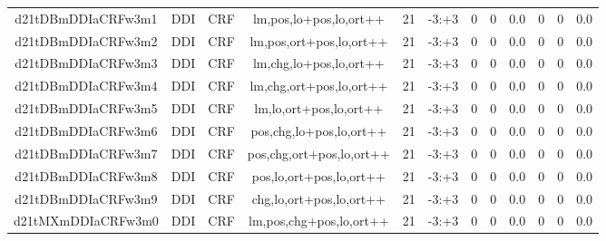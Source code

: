 \documentclass[a4paper]{article}
\begin{document}
\begin{landscape}
\begin{center}
\begin{tabular}{ |c|c|c|c|c|c|c|c|c|c|c|c|}
 
 	
 	\small{ d21tDBmDDIaCRFw3m1 } & \small{ DDI} & \small{  CRF }  & lm,pos,lo+pos,lo,ort++  &  21 &  \small{  -3:+3 }  &  0 & 0 & 0.0  &  0 & 0 & 0.0 \\
 	

 
 	
 	\small{ d21tDBmDDIaCRFw3m2 } & \small{ DDI} & \small{  CRF }  & lm,pos,ort+pos,lo,ort++  &  21 &  \small{  -3:+3 }  &  0 & 0 & 0.0  &  0 & 0 & 0.0 \\
 	

 
 	
 	\small{ d21tDBmDDIaCRFw3m3 } & \small{ DDI} & \small{  CRF }  & lm,chg,lo+pos,lo,ort++  &  21 &  \small{  -3:+3 }  &  0 & 0 & 0.0  &  0 & 0 & 0.0 \\
 	

 
 	
 	\small{ d21tDBmDDIaCRFw3m4 } & \small{ DDI} & \small{  CRF }  & lm,chg,ort+pos,lo,ort++  &  21 &  \small{  -3:+3 }  &  0 & 0 & 0.0  &  0 & 0 & 0.0 \\
 	

 
 	
 	\small{ d21tDBmDDIaCRFw3m5 } & \small{ DDI} & \small{  CRF }  & lm,lo,ort+pos,lo,ort++  &  21 &  \small{  -3:+3 }  &  0 & 0 & 0.0  &  0 & 0 & 0.0 \\
 	

 
 	
 	\small{ d21tDBmDDIaCRFw3m6 } & \small{ DDI} & \small{  CRF }  & pos,chg,lo+pos,lo,ort++  &  21 &  \small{  -3:+3 }  &  0 & 0 & 0.0  &  0 & 0 & 0.0 \\
 	

 
 	
 	\small{ d21tDBmDDIaCRFw3m7 } & \small{ DDI} & \small{  CRF }  & pos,chg,ort+pos,lo,ort++  &  21 &  \small{  -3:+3 }  &  0 & 0 & 0.0  &  0 & 0 & 0.0 \\
 	

 
 	
 	\small{ d21tDBmDDIaCRFw3m8 } & \small{ DDI} & \small{  CRF }  & pos,lo,ort+pos,lo,ort++  &  21 &  \small{  -3:+3 }  &  0 & 0 & 0.0  &  0 & 0 & 0.0 \\
 	

 
 	
 	\small{ d21tDBmDDIaCRFw3m9 } & \small{ DDI} & \small{  CRF }  & chg,lo,ort+pos,lo,ort++  &  21 &  \small{  -3:+3 }  &  0 & 0 & 0.0  &  0 & 0 & 0.0 \\
 	

 
 	
 	\small{ d21tMXmDDIaCRFw3m0 } & \small{ DDI} & \small{  CRF }  & lm,pos,chg+pos,lo,ort++  &  21 &  \small{  -3:+3 }  &  0 & 0 & 0.0  &  0 & 0 & 0.0 \\
 	


\end{tabular}
\end{center}
\end{landscape}
\end{document}
